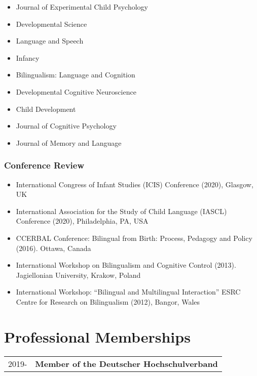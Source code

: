 \documentclass[10pt,a4paper,]{article}
\makeatletter
\providecommand{\tightlist}{%
  \setlength{\itemsep}{0pt}\setlength{\parskip}{0pt}}
\def\detaileditem#1#2#3#4#5{
#2 & \parbox[t]{0.85\textwidth}{%
      \textbf{#1}\hfill{\footnotesize #3}\\
      \ifx#4\empty\else#4\par\fi%
      \ifx#5\empty\else{%
        \vspace{0.1cm}\begin{minipage}{0.7\textwidth}%
        \begin{itemize}#5\end{itemize}%
        \end{minipage}}\fi%
      \vspace{\parsep}}\\}
\def\detailedsection#1{\begin{longtable}{@{\extracolsep{\fill}}ll}#1\end{longtable}}
\makeatother
\begin{document}
\begin{itemize}
\tightlist
\item
  Journal of Experimental Child Psychology
\item
  Developmental Science
\item
  Language and Speech
\item
  Infancy
\item
  Bilingualism: Language and Cognition
\item
  Developmental Cognitive Neuroscience
\item
  Child Development
\item
  Journal of Cognitive Psychology
\item
  Journal of Memory and Language
\end{itemize}

\hypertarget{conference-review}{%
\subsubsection{Conference Review}\label{conference-review}}

\begin{itemize}
\tightlist
\item
  International Congress of Infant Studies (ICIS) Conference (2020), Glasgow, UK
\item
  International Association for the Study of Child Language (IASCL) Conference (2020), Philadelphia, PA, USA
\item
  CCERBAL Conference: Bilingual from Birth: Process, Pedagogy and Policy (2016). Ottawa, Canada
\item
  International Workshop on Bilingualism and Cognitive Control (2013). Jagiellonian University, Krakow, Poland
\item
  International Workshop: ``Bilingual and Multilingual Interaction'' ESRC Centre for Research on Bilingualism (2012), Bangor, Wales
\end{itemize}

\hypertarget{professional-memberships}{%
\section{Professional Memberships}\label{professional-memberships}}

\detailedsection{\detaileditem{Member of the Deutscher Hochschulverband}{2019-}{}{}{\empty}\detaileditem{Member of the International Congress on Infant Studies}{2018-}{}{}{\empty}\detaileditem{Member of the National Postdoctoral Association (USA)}{2017-}{}{}{\empty}\detaileditem{Member of Women in Cognitive Science (WICS)}{2012-}{}{}{\empty}}
\end{document}
